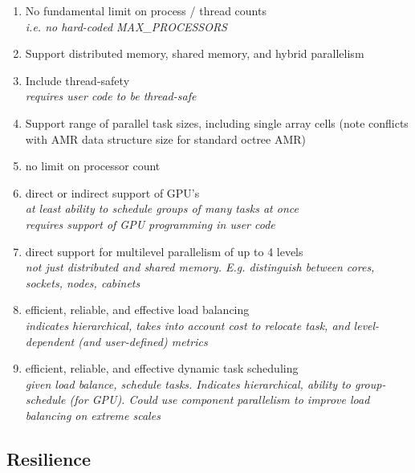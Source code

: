 \documentclass{article}
\begin{document}
\begin{enumerate}
    \item No fundamental limit on process / thread counts
      \\ \textit{i.e. no hard-coded MAX\_PROCESSORS}
    \item Support distributed memory, shared memory, and hybrid parallelism
    \item Include thread-safety
      \\ \textit{requires user code to be thread-safe }
    \item Support range of parallel task sizes, including single array cells
     (note conflicts with AMR data structure size for standard octree AMR)
    \item no limit on processor count
    \item direct or indirect support of GPU's
      \\ \textit{at least ability to schedule groups of many tasks at once }
      \\ \textit{requires support of GPU programming in user code }
    \item direct support for multilevel parallelism of up to 4 levels
      \\ \textit{not just distributed and shared memory.  E.g. distinguish
        between cores, sockets, nodes, cabinets }
    \item efficient, reliable, and effective load balancing
      \\ \textit{indicates hierarchical, takes into account cost to relocate task,
        and level-dependent (and user-defined)  metrics }
    \item efficient, reliable, and effective dynamic task scheduling
      \\ \textit{given load balance, schedule tasks.  Indicates hierarchical,
        ability to group-schedule (for GPU).  Could use component parallelism
        to improve load balancing on extreme scales~\cite{@@@Shalf} }
\end{enumerate}
  
\subsection{Resilience}
\end{document}
